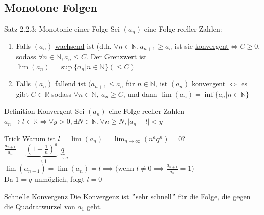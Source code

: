 \documentclass[a4paper,10pt]{article}
\begin{document}
\subsection{Monotone Folgen}
\begin{tbox}{Satz 2.2.3: Monotonie einer Folge}
    Sei $(a_n)$ eine Folge reeller Zahlen:
    \begin{enumerate}
        \item Falls $(a_n)$ \underline{wachsend} ist (d.h. $\forall n\in \mathbb N, a_{n+1}\ge a_n$ ist sie \underline{konvergent}$\iff C\ge 0 $, sodass $\forall n \in \mathbb N, a_n \le C$.
        Der Grenzwert ist $\lim(a_n) = \sup\{a_n|n\in\mathbb N \} (\le C)$
        \item Falls $(a_n)$ \underline{fallend} ist $(a_{n+1}\le a_n $ für $n\in \mathbb N $, ist $(a_n)$ konvergent $\iff$ es gibt $C\in \mathbb R$ sodass $\forall n \in \mathbb N,\ a_n\ge C$, und dann $ \lim(a_n)=\inf\{a_n|n\in \mathbb N\}$
    \end{enumerate}
\end{tbox}

\begin{defbox} {Definition Konvergent}
Sei $(a_n)$ eine Folge reeller Zahlen $a_n\longrightarrow l  \in \mathbb R \iff \forall y > 0, \exists N \in \mathbb N, \forall n \ge N, |a_n-l|<y$
\end{defbox}
\begin{tipbox}{Trick}
    Warum ist $l=\lim(a_n)=\lim_{n\to\infty}(n^a q^n)=0$?\\
    $\frac{a_{n+1}}{a_n}=\underbrace{(1+\frac{1}{n})^a}_{\to 1} \underbrace{q}_{\to q}$
    \\ $\lim(a_{n+1})=\lim(a_n)=l \implies ($wenn $ l\neq 0 \implies \frac{a_{n+1}}{a_n}=1) $
    \\ Da $1=q $ unmöglich, folgt $l=0$
\end{tipbox}
\begin{bembox}{Schnelle Konvergenz}
    Die Konvergenz ist $"$sehr schnell$"$ für die Folge, die gegen die Quadratwurzel von $a_1$ geht.
\end{bembox}
\end{document}
